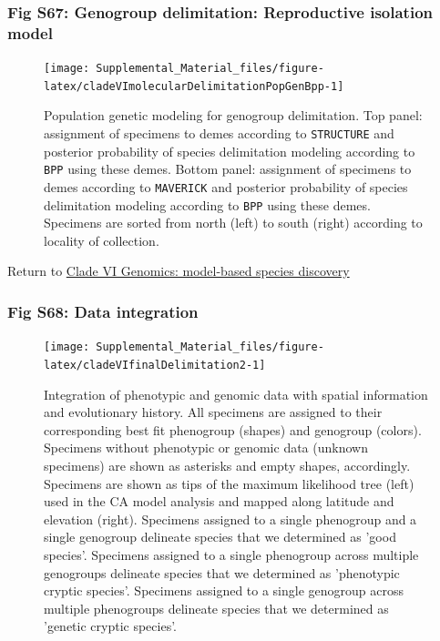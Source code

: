 \documentclass[
  11pt,
]{article}
\begin{document}
\hypertarget{fig-s67-genogroup-delimitation-reproductive-isolation-model}{%
\subsubsection{Fig S67: Genogroup delimitation: Reproductive isolation model}\label{fig-s67-genogroup-delimitation-reproductive-isolation-model}}

\begin{figure}
\texttt{[image: Supplemental\_Material\_files/figure-latex/cladeVImolecularDelimitationPopGenBpp-1]} \caption{Population genetic modeling for genogroup delimitation. Top panel: assignment of specimens to demes according to \texttt{STRUCTURE} and posterior probability of species delimitation modeling according to \texttt{BPP} using these demes. Bottom panel: assignment of specimens to demes according to \texttt{MAVERICK} and posterior probability of species delimitation modeling according to \texttt{BPP} using these demes. Specimens are sorted from north (left) to south (right) according to locality of collection.}\label{fig:cladeVImolecularDelimitationPopGenBpp}
\end{figure}

Return to \protect\hyperlink{model-based-species-discovery-11}{Clade VI Genomics: model-based species discovery}
\pagebreak

\hypertarget{fig-s68-data-integration}{%
\subsubsection{Fig S68: Data integration}\label{fig-s68-data-integration}}

\begin{figure}
\texttt{[image: Supplemental\_Material\_files/figure-latex/cladeVIfinalDelimitation2-1]} \caption{Integration of phenotypic and genomic data with spatial information and evolutionary history. All specimens are assigned to their corresponding best fit phenogroup (shapes) and genogroup (colors). Specimens without phenotypic or genomic data (unknown specimens) are shown as asterisks and empty shapes, accordingly. Specimens are shown as tips of the maximum likelihood tree (left) used in the CA model analysis and mapped along latitude and elevation (right). Specimens assigned to a single phenogroup and a single genogroup delineate species that we determined as 'good species'. Specimens assigned to a single phenogroup across multiple genogroups delineate species that we determined as 'phenotypic cryptic species'. Specimens assigned to a single genogroup across multiple phenogroups delineate species that we determined as 'genetic cryptic species'.}\label{fig:cladeVIfinalDelimitation2}
\end{figure}
\end{document}
